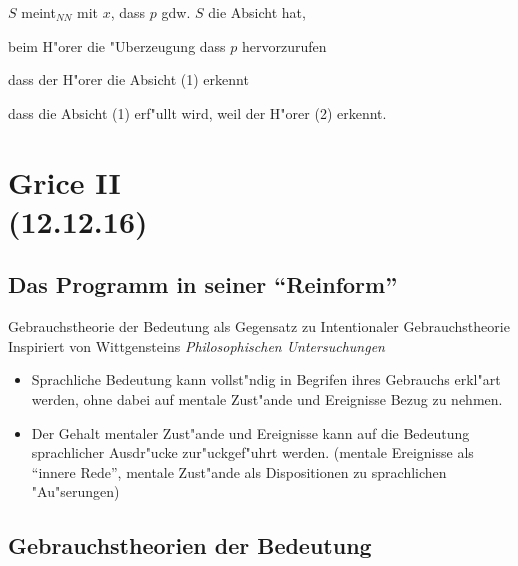 \documentclass[emulatestandardclasses]{scrartcl}
\begin{document}
\noindent $S$ meint$_{NN}$ mit $x$, dass $p$ gdw. $S$ die Absicht hat, 

\begin{description}[leftmargin=!,labelwidth=\widthof{\bfseries 3}]
    \item[1] beim H"orer die "Uberzeugung dass $p$ hervorzurufen
    \item[2] dass der H"orer die Absicht (1) erkennt
    \item[3] dass die Absicht (1) erf"ullt wird, weil der H"orer (2) erkennt.
\end{description}


\section{Grice II\\(12.12.16)}

\subsection{Das Programm in seiner "`Reinform"'}

Gebrauchstheorie der Bedeutung als Gegensatz zu Intentionaler Gebrauchstheorie\\
Inspiriert von Wittgensteins \emph{Philosophischen Untersuchungen}

\begin{itemize}
  \item Sprachliche Bedeutung kann vollst"ndig in Begrifen ihres Gebrauchs erkl"art werden, ohne dabei auf mentale Zust"ande und Ereignisse Bezug zu nehmen.
  \item Der Gehalt mentaler Zust"ande und Ereignisse kann auf die Bedeutung sprachlicher Ausdr"ucke zur"uckgef"uhrt werden. (mentale Ereignisse als "`innere Rede"', mentale Zust"ande als Dispositionen zu sprachlichen "Au"serungen)
\end{itemize}

\subsection{Gebrauchstheorien der Bedeutung}
\end{document}
